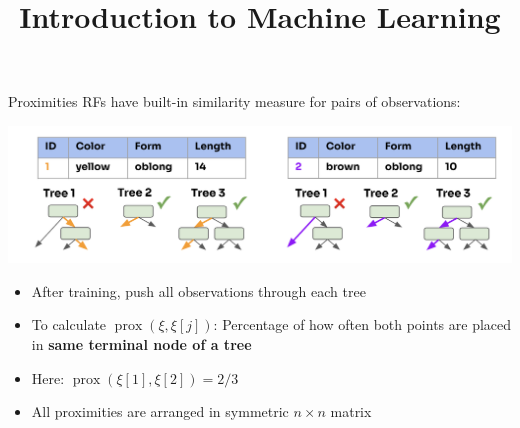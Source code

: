 \documentclass[11pt,compress,t,notes=noshow, xcolor=table]{beamer}
\title{Introduction to Machine Learning}
\begin{document}

\begin{vbframe}{Proximities}
RFs have built-in similarity measure for pairs of observations:

\begin{center}
\includegraphics[width=1\textwidth]{figure_man/forest-proximities.png}
\end{center}

\begin{itemize}
  \item After training, push all observations through each tree
  \item To calculate $\operatorname{prox}\left(\xi, \xi[j]\right)$:
    Percentage of how often both points are placed in \textbf{same terminal node of a tree}
  \item Here: $\operatorname{prox}\left(\xi[1], \xi[2]\right) = 2/3$
  \item All proximities are arranged in symmetric $n \times n$ matrix
\end{itemize}

\end{vbframe}
\end{document}
